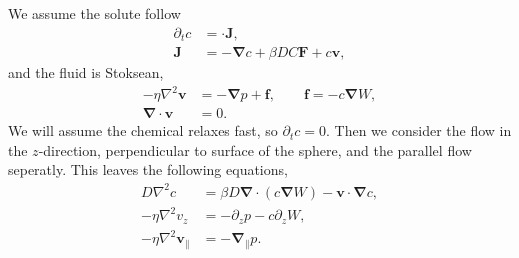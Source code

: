 We assume the solute follow
%
\begin{align}
    \partial_t c &= \bm \cdot \bm J,\\
    \bm J &= - \bm \nabla c + \beta D C \bm F + c \bm v,
\end{align}
%
and the fluid is Stoksean,
%
\begin{align}
    - \eta \nabla^2 \bm v &= - \bm \nabla p + \bm f, \quad\quad \bm f = - c \bm \nabla W,\\
    \bm \nabla \cdot \bm v &= 0.
\end{align}
%
We will assume the chemical relaxes fast, so $\partial_t c = 0$.
Then we consider the flow in the $z$-direction, perpendicular to surface of the sphere, and the parallel flow seperatly.
This leaves the following equations,
%
\begin{align}
    D \nabla^2 c &= \beta D \bm \nabla \cdot (c \bm \nabla W) - \bm v \cdot \bm \nabla c,\\
    - \eta \nabla^2 v_z &= - \partial_z p - c \partial_z W, \\
    - \eta \nabla^2 \bm v_\parallel & = - \bm \nabla_\parallel p.
\end{align}
%
